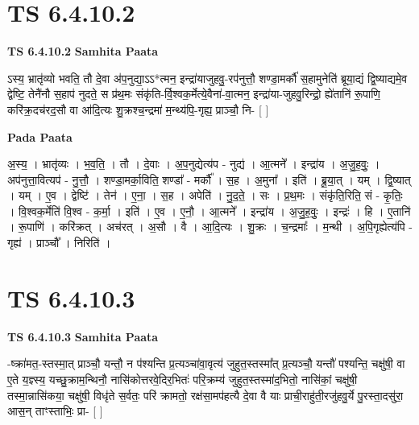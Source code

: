 \documentclass[17pt]{extarticle}
\begin{document}
\section*{ TS 6.4.10.2 }

\textbf{TS 6.4.10.2 } \newline
\textbf{Samhita Paata} \newline

ऽस्य॒ भ्रातृ॑व्यो भवति॒ तौ दे॒वा अ॑प॒नुद्या॒ऽऽ*त्मन॒ इन्द्रा॑याजुहवु॒-रप॑नुत्तौ॒ शण्डा॒मर्कौ॑ स॒हामुनेति॑ ब्रूया॒द्यं द्वि॒ष्याद्यमे॒व द्वेष्टि॒ तेनै॑नौ स॒हाप॑ नुदते॒ स प्र॑थ॒मः संकृ॑ति-र्वि॒श्वक॒र्मेत्ये॒वैना॑-वा॒त्मन॒ इन्द्रा॑या-जुहवु॒रिन्द्रो॒ ह्ये॑तानि॑ रू॒पाणि॒ करि॑क्र॒दच॑रद॒सौ वा आ॑दि॒त्यः शु॒क्रश्च॒न्द्रमा॑ म॒न्थ्य॑पि॒-गृह्य॒ प्राञ्चौ॒ नि- [  ] \newline

\textbf{Pada Paata} \newline

अ॒स्य॒ । भ्रातृ॑व्यः । भ॒व॒ति॒ । तौ । दे॒वाः । अ॒प॒नुद्येत्य॑प - नुद्य॑ । आ॒त्मने᳚ । इन्द्रा॑य । अ॒जु॒ह॒वुः॒ । अप॑नुत्ता॒वित्यप॑ - नु॒त्तौ॒ । शण्डा॒मर्का॒विति॒ शण्डा᳚ - मर्कौ᳚ । स॒ह । अ॒मुना᳚ । इति॑ । ब्रू॒या॒त् । यम् । द्वि॒ष्यात् । यम् । ए॒व । द्वेष्टि॑ । तेन॑ । ए॒ना॒ । स॒ह । अपेति॑ । नु॒द॒ते॒ । सः । प्र॒थ॒मः । संकृ॑ति॒रिति॒ सं - कृ॒तिः॒ । वि॒श्वक॒र्मेति॑ वि॒श्व - क॒र्मा॒ । इति॑ । ए॒व । ए॒नौ॒ । आ॒त्मने᳚ । इन्द्रा॑य । अ॒जु॒ह॒वुः॒ । इन्द्रः॑ । हि । ए॒तानि॑ । रू॒पाणि॑ । करि॑क्रत् । अच॑रत् । अ॒सौ । वै । आ॒दि॒त्यः । शु॒क्रः । च॒न्द्रमाः᳚ । म॒न्थी । अ॒पि॒गृह्येत्य॑पि - गृह्य॑ । प्राञ्चौ᳚ । निरिति॑ ।  \newline




\section*{ TS 6.4.10.3 }

\textbf{TS 6.4.10.3 } \newline
\textbf{Samhita Paata} \newline

-ष्क्रा॑मत॒-स्तस्मा॒त् प्राञ्चौ॒ यन्तौ॒ न प॑श्यन्ति प्र॒त्यञ्चा॑वा॒वृत्य॑ जुहुत॒स्तस्मा᳚त् प्र॒त्यञ्चौ॒ यन्तौ॑ पश्यन्ति॒ चक्षु॑षी॒ वा ए॒ते य॒ज्ञ्स्य॒ यच्छु॒क्राम॒न्थिनौ॒ नासि॑कोत्तरवे॒दिर॒भितः॑ परि॒क्रम्य॑ जुहुत॒स्तस्मा॑द॒भितो॒ नासि॑कां॒ चक्षु॑षी॒ तस्मा॒न्नासि॑कया॒ चक्षु॑षी॒ विधृ॑ते स॒र्वतः॒ परि॑ क्रामतो॒ रक्ष॑सा॒मप॑हत्यै दे॒वा वै याः प्राची॒राहु॑ती॒रजु॑हवु॒र्ये पु॒रस्ता॒दसु॑रा॒ आस॒न् ताꣳस्ताभिः॒ प्रा- [  ] \newline
\end{document}
